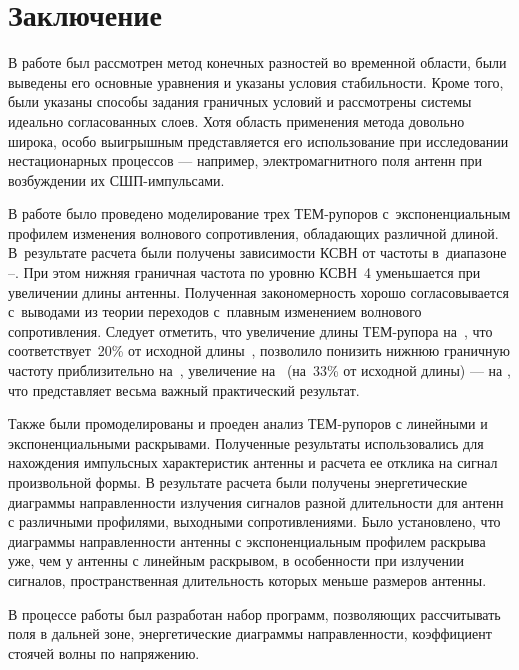 \chapter*{Заключение}

В работе был рассмотрен метод конечных разностей во временной области, были
выведены его основные уравнения и указаны условия стабильности.
Кроме того, были указаны способы задания граничных условий и рассмотрены
системы идеально согласованных слоев. Хотя область применения метода довольно широка, особо
выигрышным представляется его использование при исследовании нестационарных
процессов --- например, электромагнитного поля антенн при возбуждении их
СШП-импульсами.

В работе было проведено моделирование трех ТЕМ-рупоров с~экспоненциальным профилем
изменения волнового
сопротивления, обладающих различной длиной. В~результате расчета были получены
зависимости КСВН от частоты в~диапазоне --. При этом
нижняя граничная частота по уровню КСВН~4 уменьшается при увеличении длины
антенны. Полученная закономерность хорошо согласовывается с~выводами из теории
переходов с~плавным изменением волнового сопротивления. Следует отметить,
что увеличение длины ТЕМ-рупора на~, что соответствует~20\% от
исходной длины~, позволило понизить нижнюю граничную частоту
приблизительно на~, увеличение на~ (на~33\% от
исходной длины) --- на , что представляет весьма важный
практический результат.

Также были промоделированы и проеден анализ ТЕМ-рупоров с линейными
и экспоненциальными раскрывами. Полученные результаты
использовались для нахождения импульсных характеристик антенны и расчета ее
отклика на сигнал произвольной формы.
В результате расчета были получены энергетические диаграммы
направленности излучения сигналов разной длительности для антенн с различными
профилями, выходными сопротивлениями.
Было установлено, что диаграммы направленности антенны с экспоненциальным
профилем раскрыва уже, чем у антенны с линейным раскрывом, в особенности при
излучении сигналов, пространственная длительность которых меньше размеров
антенны.

В процессе работы был разработан набор программ, позволяющих рассчитывать поля
в дальней зоне, энергетические диаграммы направленности, коэффициент стоячей
волны по напряжению.
